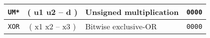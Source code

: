 \begin{center}
\begin{longtable}{|c|c|l|c|}
      \texttt{UM*}                            &
      ( u1 u2 -- d )                          &
      Unsigned multiplication                 &
      \texttt{0000}                           \\ \hline

      \texttt{XOR}                            &
      ( x1 x2 -- x3 )                         &
      Bitwise exclusive-OR                    &
      \texttt{0000}                           \\ \hline
                                  
  \end{longtable}
\end{center}  
\endgroup

